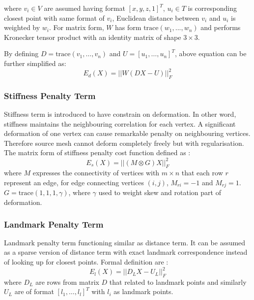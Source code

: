 where $v_i \in V$ are assumed having format $[x,y,z,1]^T$, $u_i \in T$ is corresponding closest point with same format of $v_i$, Euclidean distance between $v_i$ and $u_i$ is weighted by $w_i$. For matrix form, $W$ has form $\text{trace}(w_1,...,w_n)$ and performs Kronecker tensor product with an identity matrix of shape $3 \times 3$. 

By defining $D = \text{trace}(v_1,\dotsc,v_n)$ and $U=[u_1,\dotsc,u_n]^T$, above equation can be further simplified as:
\begin{equation}
E_d(X) = ||W(DX-U)||^2_F
\end{equation}

\subsubsection{Stiffness Penalty Term}
\label{sec:nicpst}

Stiffness term is introduced to have constrain on deformation. In other word, stiffness maintains the neighbouring  correlation for each vertex. A significant deformation of one vertex can cause remarkable penalty on neighbouring vertices. Therefore source mesh cannot deform completely freely but with regularisation. The matrix form of stiffness penalty cost function defined as \cite{Amberg2007}:
\begin{equation}
E_s(X)=||(M \otimes G)X||^2_F
\end{equation}
where $M$ expresses the connectivity of vertices with $m \times n$ that each row $r$ represent an edge, for edge connecting vertices $(i,j)$, $M_{ri}=-1$ and $M_{rj}=1$. $G=\text{trace}(1,1,1,\gamma)$, where $\gamma$ used to weight skew and rotation part of deformation.

\subsubsection{Landmark Penalty Term}
\label{sec:nicplt}

Landmark penalty term functioning similar as distance term. It can be assumed as a sparse version of distance term with exact landmark correspondence instead of looking up for closest points. Formal definition are \cite{Amberg2007}:
\begin{equation}
E_l(X)=||D_LX-U_L||^2_F
\end{equation}
where $D_L$ are rows from matrix $D$ that related to landmark points and similarly $U_L$ are of format $[l_1,\dotsc,l_l]^T$ with $l_i$ as landmark points.

